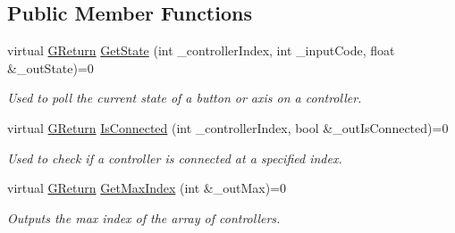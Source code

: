 \subsection*{Public Member Functions}
\begin{DoxyCompactItemize}
\item 
\mbox{\label{class_g_w_1_1_s_y_s_t_e_m_1_1_g_controller_a82063acba6d46aa5aed46413cdc0e4a6}} 
virtual \mbox{\hyperlink{namespace_g_w_a67a839e3df7ea8a5c5686613a7a3de21}{G\+Return}} \mbox{\hyperlink{class_g_w_1_1_s_y_s_t_e_m_1_1_g_controller_a82063acba6d46aa5aed46413cdc0e4a6}{Get\+State}} (int \+\_\+controller\+Index, int \+\_\+input\+Code, float \&\+\_\+out\+State)=0
\begin{DoxyCompactList}\small\item\em Used to poll the current state of a button or axis on a controller. \end{DoxyCompactList}\item 
\mbox{\label{class_g_w_1_1_s_y_s_t_e_m_1_1_g_controller_ac0692af48ccfd57c3f786ab15ed671b2}} 
virtual \mbox{\hyperlink{namespace_g_w_a67a839e3df7ea8a5c5686613a7a3de21}{G\+Return}} \mbox{\hyperlink{class_g_w_1_1_s_y_s_t_e_m_1_1_g_controller_ac0692af48ccfd57c3f786ab15ed671b2}{Is\+Connected}} (int \+\_\+controller\+Index, bool \&\+\_\+out\+Is\+Connected)=0
\begin{DoxyCompactList}\small\item\em Used to check if a controller is connected at a specified index. \end{DoxyCompactList}\item 
\mbox{\label{class_g_w_1_1_s_y_s_t_e_m_1_1_g_controller_a137bbcedb9bc62675e4c3606bb483d5b}} 
virtual \mbox{\hyperlink{namespace_g_w_a67a839e3df7ea8a5c5686613a7a3de21}{G\+Return}} \mbox{\hyperlink{class_g_w_1_1_s_y_s_t_e_m_1_1_g_controller_a137bbcedb9bc62675e4c3606bb483d5b}{Get\+Max\+Index}} (int \&\+\_\+out\+Max)=0
\begin{DoxyCompactList}\small\item\em Outputs the max index of the array of controllers. \end{DoxyCompactList}\item 
\mbox{\label{class_g_w_1_1_s_y_s_t_e_m_1_1_g_controller_ae7905c691a0304c11c70d337d708e5b8}} 

\end{DoxyCompactItemize}
